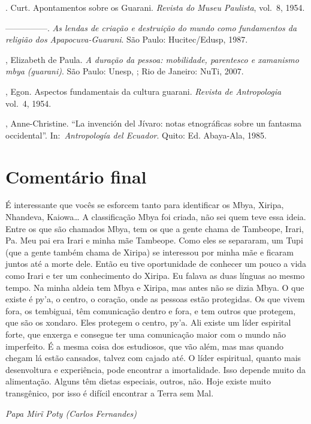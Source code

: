 \begin{Parskip}
. Curt. Apontamentos sobre os Guarani. \emph{Revista do Museu
Paulista}, vol.~8, 1954.

—————. \emph{As lendas de criação e destruição do mundo como fundamentos da
religião dos Apapocuva-Guarani}. São Paulo: Hucitec/Edusp, 1987.

, Elizabeth de Paula. \emph{A duração da pessoa: mobilidade,
parentesco e xamanismo mbya (guarani)}. São Paulo: Unesp, ; Rio de
Janeiro: NuTi, 2007.

, Egon. Aspectos fundamentais da cultura guarani. \emph{Revista de
Antropologia} vol.~4, 1954.

, Anne-Christine. ``La invención del Jívaro: notas etnográficas
sobre un fantasma occidental''. In:~\emph{Antropología del Ecuador}. Quito: Ed.
Abaya-Ala, 1985.
\end{Parskip}

\section{Comentário final}
É interessante que vocês se esforcem tanto para identificar os Mbya,
Xiripa, Nhandeva, Kaiowa\ldots{} A classificação Mbya foi criada, não sei
quem teve essa ideia. Entre os que são chamados Mbya, tem os que a
gente chama de Tambeope, Irari, Pa. Meu pai era Irari e
minha mãe Tambeope. Como eles se separaram, um Tupi (que a gente também
chama de Xiripa) se interessou por minha mãe e ficaram juntos até a
morte dele. Então eu tive oportunidade de conhecer um pouco a vida como
Irari e ter um conhecimento do Xiripa. Eu falava as duas línguas ao
mesmo tempo. Na minha aldeia tem Mbya e Xiripa, mas antes não se dizia
Mbya. O que existe é py’a, o centro, o coração, onde as pessoas estão
protegidas. Os que vivem fora, os tembiguai, têm comunicação dentro e
fora, e tem outros que protegem, que são os xondaro. Eles protegem o
centro, py’a. Ali existe um líder espirital forte, que enxerga e
consegue ter uma comunicação maior com o mundo não imperfeito. É a
mesma coisa dos estudiosos, que vão além, mas mas quando chegam lá
estão cansados, talvez com cajado até. O líder espiritual, quanto mais
desenvoltura e experiência, pode encontrar a imortalidade. Isso depende
muito da alimentação. Alguns têm dietas especiais, outros, não. Hoje
existe muito transgênico, por isso é difícil encontrar a Terra sem Mal.
\medskip
\begin{flushright}
\emph{Papa Mir\~{i} Poty (Carlos Fernandes)} 
\end{flushright}

